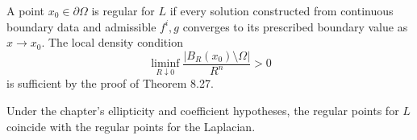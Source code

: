 \begin{definition}
\label{gt-def-8-regular-boundary-point}
A point $x_0\in\partial\Omega$ is regular for $L$ if every solution constructed
from continuous boundary data and admissible $f^i,g$ converges to its prescribed
boundary value as $x\to x_0$. The local density condition
\begin{equation}
\liminf_{R\downarrow0}\frac{|B_R(x_0)\setminus\Omega|}{R^n}>0
\tag{8.75}
\end{equation}
is sufficient by the proof of Theorem 8.27.
\end{definition}

\begin{remark}
\label{gt-rem-8-regular-points-laplacian}
Under the chapter's ellipticity and coefficient hypotheses, the regular points
for $L$ coincide with the regular points for the Laplacian.
\end{remark}


